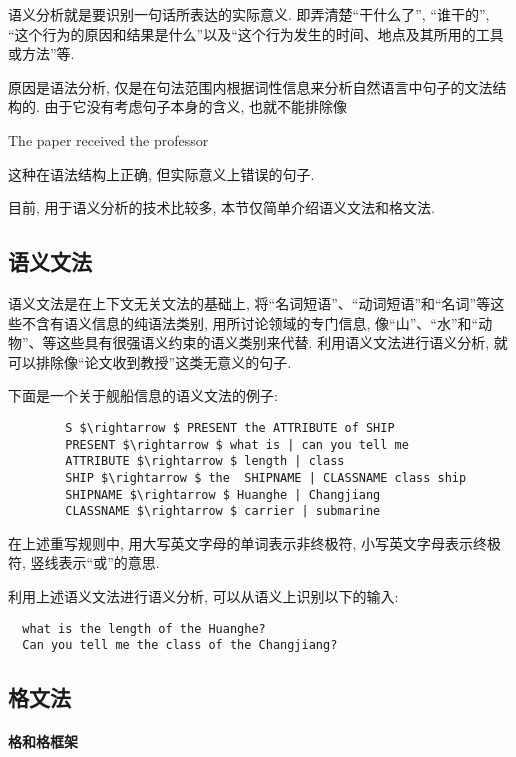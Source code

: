语义分析就是要识别一句话所表达的实际意义. 即弄清楚“干什么了”, “谁干的”, “这个行为的原因和结果是什么”以及“这个行为发生的时间、地点及其所用的工具或方法”等.

原因是语法分析, 仅是在句法范围内根据词性信息来分析自然语言中句子的文法结构的. 由于它没有考虑句子本身的含义, 也就不能排除像
\begin{center}
  The  paper  received  the  professor
\end{center}
这种在语法结构上正确, 但实际意义上错误的句子.

目前, 用于语义分析的技术比较多, 本节仅简单介绍语义文法和格文法.
\subsection{语义文法}
    语义文法是在上下文无关文法的基础上, 将“名词短语”、“动词短语”和“名词”等这些不含有语义信息的纯语法类别, 用所讨论领域的专门信息, 像“山”、“水”和“动物”、等这些具有很强语义约束的语义类别来代替. 利用语义文法进行语义分析, 就可以排除像“论文收到教授”这类无意义的句子.

\begin{example}
下面是一个关于舰船信息的语义文法的例子:
\begin{Verbatim}
        S $\rightarrow $ PRESENT the ATTRIBUTE of SHIP
        PRESENT $\rightarrow $ what is | can you tell me
        ATTRIBUTE $\rightarrow $ length | class
        SHIP $\rightarrow $ the  SHIPNAME | CLASSNAME class ship
        SHIPNAME $\rightarrow $ Huanghe | Changjiang
        CLASSNAME $\rightarrow $ carrier | submarine
\end{Verbatim}
在上述重写规则中, 用大写英文字母的单词表示非终极符, 小写英文字母表示终极符, 竖线表示“或”的意思.
\end{example}

利用上述语义文法进行语义分析, 可以从语义上识别以下的输入:
\begin{Verbatim}
  what is the length of the Huanghe?
  Can you tell me the class of the Changjiang?
\end{Verbatim}
\subsection{格文法}

\paragraph{格和格框架}

